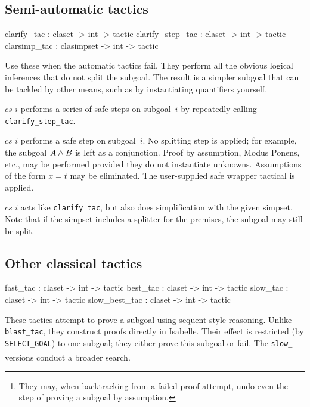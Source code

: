 \subsection{Semi-automatic tactics}
\begin{ttbox} 
clarify_tac      : claset -> int -> tactic
clarify_step_tac : claset -> int -> tactic
clarsimp_tac     : clasimpset -> int -> tactic
\end{ttbox}
Use these when the automatic tactics fail.  They perform all the obvious
logical inferences that do not split the subgoal.  The result is a
simpler subgoal that can be tackled by other means, such as by
instantiating quantifiers yourself.
\begin{ttdescription}
\item[\ttindexbold{clarify_tac} $cs$ $i$] performs a series of safe steps on
subgoal~$i$ by repeatedly calling \texttt{clarify_step_tac}.
\item[\ttindexbold{clarify_step_tac} $cs$ $i$] performs a safe step on
  subgoal~$i$.  No splitting step is applied; for example, the subgoal $A\wedge
  B$ is left as a conjunction.  Proof by assumption, Modus Ponens, etc., may be
  performed provided they do not instantiate unknowns.  Assumptions of the
  form $x=t$ may be eliminated.  The user-supplied safe wrapper tactical is
  applied.
\item[\ttindexbold{clarsimp_tac} $cs$ $i$] acts like \texttt{clarify_tac}, but
also does simplification with the given simpset. Note that if the simpset 
includes a splitter for the premises, the subgoal may still be split.
\end{ttdescription}


\subsection{Other classical tactics}
\begin{ttbox} 
fast_tac      : claset -> int -> tactic
best_tac      : claset -> int -> tactic
slow_tac      : claset -> int -> tactic
slow_best_tac : claset -> int -> tactic
\end{ttbox}
These tactics attempt to prove a subgoal using sequent-style reasoning.
Unlike \texttt{blast_tac}, they construct proofs directly in Isabelle.  Their
effect is restricted (by \texttt{SELECT_GOAL}) to one subgoal; they either prove
this subgoal or fail.  The \texttt{slow_} versions conduct a broader
search.%
\footnote{They may, when backtracking from a failed proof attempt, undo even
  the step of proving a subgoal by assumption.}

